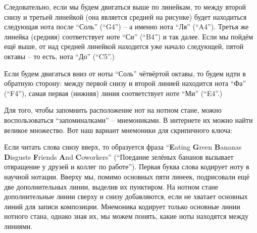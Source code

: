 \documentclass[a4paper,twoside]{book}
\begin{document}
Следовательно, если мы будем двигаться выше по линейкам, то между второй снизу и
третьей линейкой (она является средней на рисунке) будет находиться следующая
нота после ``Соль'' (``G4'') -- а именно нота ``Ля'' (``A4''). Третья же линейка
(средняя) соответствует ноте ``Си'' (``B4'') и так далее. Если мы пойдём ещё
выше, от над средней линейкой находится уже начало следующей, пятой октавы -- то
есть, нота ``До'' (``C5''.)

Если будем двигаться вниз от ноты ``Соль'' чётвёртой октавы, то будем идти в
обратную сторону: между первой снизу и второй линией находится нота ``Фа''
(``F4''), самая первая (нижняя) линия соответствует ноте ``Ми'' (``E4''.)

Для того, чтобы запомнить расположение нот на нотном стане, можно
воспользоваться ``запоминалками'' -- мнемониками. В интернете их можно найти
великое множество. Вот наш вариант мнемоники для скрипичного ключа:


Если читать слова снизу вверх, то образуется фраза ``\textbf{E}ating
\textbf{G}reen \textbf{B}ananas \textbf{D}isgusts \textbf{F}riends \textbf{A}nd
\textbf{C}oworkers'' (``Поедание зелёных бананов вызывает отвращение у друзей и
коллег по работе''). Первая буква слова кодирует ноту в научной нотации. Вверху
мы, помимо основных пяти линеек, подрисовали ещё две дополнительных линии,
выделив их пунктиром. На нотном стане дополнительные линии сверху и снизу
добавляются, если не хватает основных линий для записи композиции. Мнемоника
кодирует только основные линии нотного стана, однако зная их, мы можем понять,
какие ноты находятся между линиями.

\end{document}

